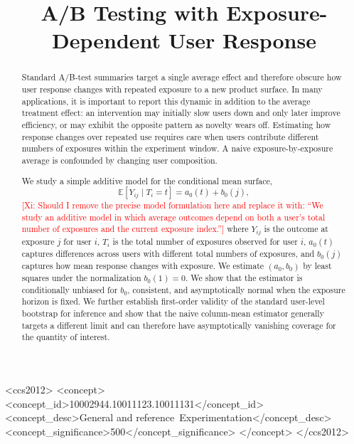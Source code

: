 \documentclass[sigconf,anonymous,review]{acmart}
\newcommand{\xg}[1]{\textcolor{red}{[Xi: #1]}}
\begin{document}
\title{A/B Testing with Exposure-Dependent User Response}

\begin{abstract}
Standard A/B-test summaries target a single average effect and therefore obscure how user response changes with repeated exposure to a new product surface. In many applications, it is important to report this dynamic in addition to the average treatment effect: an intervention may initially slow users down and only later improve efficiency, or may exhibit the opposite pattern as novelty wears off. Estimating how response changes over repeated use requires care when users contribute different numbers of exposures within the experiment window. A naive exposure-by-exposure average is confounded by changing user composition.

We study a simple additive model for the conditional mean surface,
\[
\mathbb{E}[Y_{ij}\mid T_i=t]=a_0(t)+b_0(j),
\]
\xg{Should I remove the precise model formulation here and replace it with: ``We study an additive model in which average outcomes depend on both a user's total number of exposures and the current exposure index.''}
where $Y_{ij}$ is the outcome at exposure $j$ for user $i$, $T_i$ is the total number of exposures observed for user $i$, $a_0(t)$ captures differences across users with different total numbers of exposures, and $b_0(j)$ captures how mean response changes with exposure. We estimate $(a_0,b_0)$ by least squares under the normalization $b_0(1)=0$. We show that the estimator is conditionally unbiased for $b_0$, consistent, and asymptotically normal when the exposure horizon is fixed. We further establish first-order validity of the standard user-level bootstrap for inference and show that the naive column-mean estimator generally targets a different limit and can therefore have asymptotically vanishing coverage for the quantity of interest.
\end{abstract}

\begin{CCSXML}
<ccs2012>
   <concept>
       <concept_id>10002944.10011123.10011131</concept_id>
       <concept_desc>General and reference~Experimentation</concept_desc>
       <concept_significance>500</concept_significance>
   </concept>
</ccs2012>
\end{CCSXML}


\end{document}
